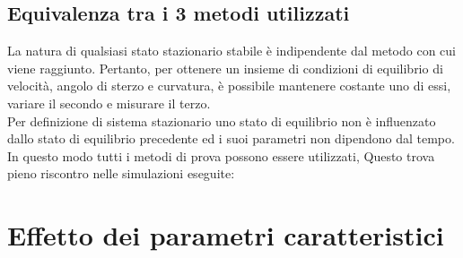 \subsection{Equivalenza tra i 3 metodi utilizzati}
La natura di qualsiasi stato stazionario stabile è indipendente dal metodo con cui viene raggiunto. Pertanto, per ottenere
un insieme  di condizioni di equilibrio di velocità, angolo di sterzo e curvatura, è possibile mantenere costante uno di
essi, variare il secondo e misurare il terzo.\\ 
Per definizione di sistema stazionario uno stato di equilibrio non è influenzato dallo stato di equilibrio precedente ed i
suoi parametri non dipendono dal tempo. 
In questo modo tutti i metodi di prova possono essere utilizzati, Questo trova pieno riscontro nelle simulazioni eseguite:\\

\section{Effetto dei parametri caratteristici}

